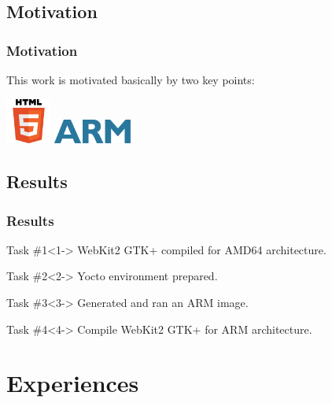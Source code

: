 \documentclass[slidestop,compress,mathserif]{beamer}
\begin{document}
\subsection{Motivation}
\begin{frame}
\frametitle{Motivation}

This work is motivated basically by two key points:
\pause

\vspace{10mm}
\begin{center}
\includegraphics[height=1.5cm]{images/HTML5-logo.png}
\hspace{10mm}
\pause
\includegraphics[height=0.8cm]{images/ARM-logo.png}
\end{center}

\end{frame}

\subsection{Results}
\begin{frame}
\frametitle{Results}

\begin{block}{Task \#1}<1->
WebKit2 GTK+ compiled for AMD64 architecture.
\end{block}

\begin{block}{Task \#2}<2->
Yocto environment prepared.
\end{block}

\begin{block}{Task \#3}<3->
Generated and ran an ARM image.
\end{block}

\begin{alertblock}{Task \#4}<4->
Compile WebKit2 GTK+ for ARM architecture.
\end{alertblock}

\end{frame}

\section{Experiences}
\end{document}
